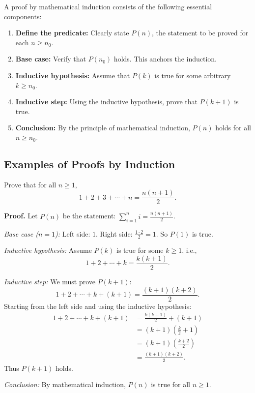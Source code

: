 \documentclass[11pt,a4paper]{article}
\begin{document}
A proof by mathematical induction consists of the following essential components:

\begin{enumerate}[label=\textbf{\arabic*.}]
    \item \textbf{Define the predicate:} Clearly state $P(n)$, the statement to be proved for each $n \geq n_0$.
    
    \item \textbf{Base case:} Verify that $P(n_0)$ holds. This anchors the induction.
    
    \item \textbf{Inductive hypothesis:} Assume that $P(k)$ is true for some arbitrary $k \geq n_0$.
    
    \item \textbf{Inductive step:} Using the inductive hypothesis, prove that $P(k+1)$ is true.
    
    \item \textbf{Conclusion:} By the principle of mathematical induction, $P(n)$ holds for all $n \geq n_0$.
\end{enumerate}

\subsection{Examples of Proofs by Induction}

\begin{example}
Prove that for all $n \geq 1$,
\begin{equation*}
    1 + 2 + 3 + \cdots + n = \frac{n(n+1)}{2}.
\end{equation*}

\textbf{Proof.} Let $P(n)$ be the statement: $\displaystyle\sum_{i=1}^{n} i = \frac{n(n+1)}{2}$.

\textit{Base case ($n = 1$):} Left side: $1$. Right side: $\frac{1 \cdot 2}{2} = 1$. So $P(1)$ is true.

\textit{Inductive hypothesis:} Assume $P(k)$ is true for some $k \geq 1$, i.e.,
\begin{equation*}
    1 + 2 + \cdots + k = \frac{k(k+1)}{2}.
\end{equation*}

\textit{Inductive step:} We must prove $P(k+1)$:
\begin{equation*}
    1 + 2 + \cdots + k + (k+1) = \frac{(k+1)(k+2)}{2}.
\end{equation*}
Starting from the left side and using the inductive hypothesis:
\begin{align*}
    1 + 2 + \cdots + k + (k+1) &= \frac{k(k+1)}{2} + (k+1) \\
    &= (k+1)\left(\frac{k}{2} + 1\right) \\
    &= (k+1)\left(\frac{k+2}{2}\right) \\
    &= \frac{(k+1)(k+2)}{2}.
\end{align*}
Thus $P(k+1)$ holds.

\textit{Conclusion:} By mathematical induction, $P(n)$ is true for all $n \geq 1$.
\end{example}
\end{document}
